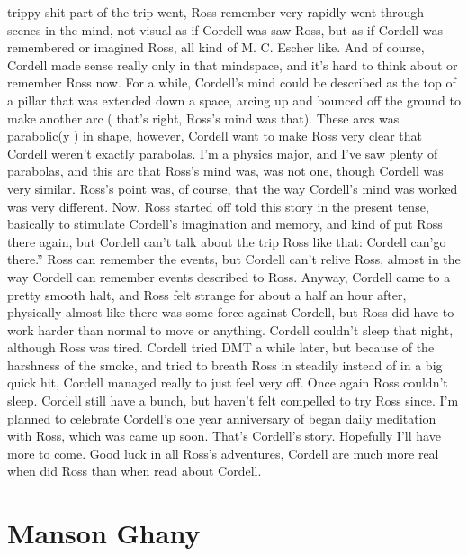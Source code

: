 \documentclass[12pt]{book}
\begin{document}
trippy shit part of the trip went, Ross remember very rapidly went through scenes in the mind, not visual as if Cordell was saw Ross, but as if Cordell was remembered or imagined Ross, all kind of M. C. Escher like. And of course, Cordell made sense really only in that mindspace, and it's hard to think about or remember Ross now. For a while, Cordell's mind could be described as the top of a pillar that was extended down a space, arcing up and bounced off the ground to make another arc ( that's right, Ross's mind was that). These arcs was parabolic(y ) in shape, however, Cordell want to make Ross very clear that Cordell weren't exactly parabolas. I'm a physics major, and I've saw plenty of parabolas, and this arc that Ross's mind was, was not one, though Cordell was very similar. Ross's point was, of course, that the way Cordell's mind was worked was very different. Now, Ross started off told this story in the present tense, basically to stimulate Cordell's imagination and memory, and kind of put Ross there again, but Cordell can't talk about the trip Ross like that: Cordell can'go there.'' Ross can remember the events, but Cordell can't relive Ross, almost in the way Cordell can remember events described to Ross. Anyway, Cordell came to a pretty smooth halt, and Ross felt strange for about a half an hour after, physically almost like there was some force against Cordell, but Ross did have to work harder than normal to move or anything. Cordell couldn't sleep that night, although Ross was tired. Cordell tried DMT a while later, but because of the harshness of the smoke, and tried to breath Ross in steadily instead of in a big quick hit, Cordell managed really to just feel very off. Once again Ross couldn't sleep. Cordell still have a bunch, but haven't felt compelled to try Ross since. I'm planned to celebrate Cordell's one year anniversary of began daily meditation with Ross, which was came up soon. That's Cordell's story. Hopefully I'll have more to come. Good luck in all Ross's adventures, Cordell are much more real when did Ross than when read about Cordell.



\chapter{Manson Ghany}
\end{document}
